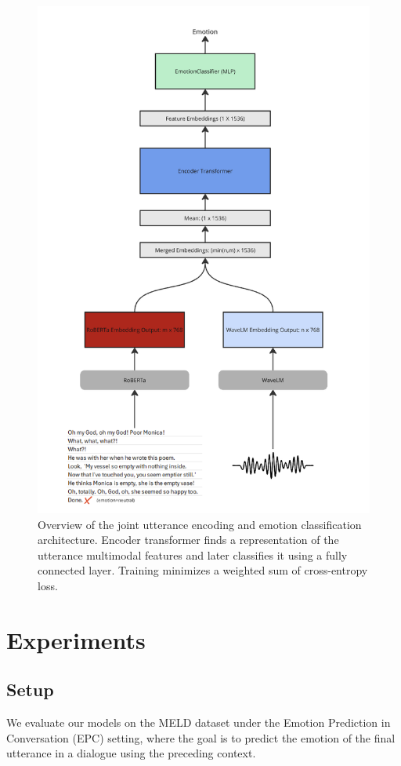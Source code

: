 \documentclass{article}
\begin{document}
\begin{figure}
  \centering
  \includegraphics[width=0.8\linewidth]{Images/transformer_encoder.png}
  \caption{Overview of the joint utterance encoding and emotion classification architecture. Encoder transformer finds a representation of the utterance multimodal features and later classifies it using a fully connected layer. Training minimizes a weighted sum of cross-entropy loss.}
  \label{fig:transf-dec}
\end{figure}

\section{Experiments}

\subsection{Setup}
We evaluate our models on the MELD dataset under the Emotion Prediction in Conversation (EPC) setting, where the goal is to predict the emotion of the final utterance in a dialogue using the preceding context.
\end{document}
